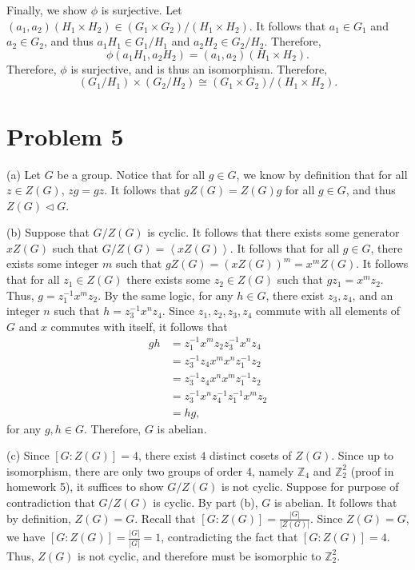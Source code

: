 \documentclass[11pt, letterpaper]{report}
\begin{document}
\begin{solution}
	Finally, we show $\phi $ is surjective. Let $(a_1,a_2)(H_1\times H_2)\in (G_1\times G_2) / (H_1\times H_2)$. It follows that $a_1\in G_1$ and $a_2\in G_2$, and thus $a_1H_1\in G_1 / H_1$ and $a_2H_2\in G_2 / H_2$. Therefore,
	\[
		\phi (a_1H_1,a_2H_2)=(a_1,a_2)(H_1\times H_2)
	.\]
	Therefore, $\phi $ is surjective, and is thus an isomorphism. Therefore,
	\[
		(G_1 / H_1) \times (G_2 / H_2) \cong (G_1\times G_2) / (H_1 \times H_2)
	.\]
\end{solution}
\section*{Problem 5}
\begin{solution}
	(a)  Let $G$ be a group. Notice that for all $g\in G$, we know by definition that for all $z\in Z(G)$, $zg=gz$. It follows that $gZ(G)=Z(G)g$ for all $g\in G$, and thus $Z(G)\triangleleft G$.

	(b) Suppose that $G / Z(G)$ is cyclic. It follows that there exists some generator $xZ(G)$ such that $G / Z(G) = \left<xZ(G) \right>$. It follows that for all $g\in G$, there exists some integer $m$ such that $gZ(G)=(xZ(G))^m=x^mZ(G)$. It follows that for all $z_1\in Z(G)$ there exists some $z_2\in Z(G)$ such that $gz_1=x^mz_2$. Thus, $g=z_1^{-1}x^mz_2$. By the same logic, for any $h\in G$, there exist $z_3,z_4$, and an integer $n$ such that $h=z_3^{-1}x^nz_4$. Since $z_1,z_2,z_3,z_4$ commute with all elements of $G$ and $x$ commutes with itself, it follows that
	\begin{align*}
		gh&=z_1^{-1}x^mz_2z_3^{-1}x^nz_4\\
		  &=z_3^{-1}z_4x^mx^nz_1^{-1}z_2\\
		  &=z_3^{-1}z_4x^nx^mz_1^{-1}z_2\\
		  &=z_3^{-1}x^nz_4^{-1}z_1^{-1}x^mz_2\\
		  &=hg
	,\end{align*}
	for any $g,h\in G$. Therefore, $G$ is abelian.

	(c) Since $\left[ G:Z(G) \right] =4$, there exist $4$ distinct cosets of $Z(G)$. Since up to isomorphism, there are only two groups of order 4, namely $\mathbb{Z}_4$ and $\mathbb{Z}_2^2$ (proof in homework 5), it suffices to show $G / Z(G)$ is not cyclic. Suppose for purpose of contradiction that $G / Z(G)$ is cyclic. By part (b), $G$ is abelian. It follows that by definition, $Z(G)=G$. Recall that $\left[ G:Z(G) \right] =\frac{\left| G \right| }{\left| Z(G) \right| }$. Since $Z(G)=G$, we have $\left[ G:Z(G) \right] =\frac{\left| G \right| }{\left| G \right| }=1$, contradicting the fact that $\left[ G:Z(G) \right] =4$. Thus, $Z(G)$ is not cyclic, and therefore must be isomorphic to $\mathbb{Z}_2^2$.


\end{solution}
\end{document}
